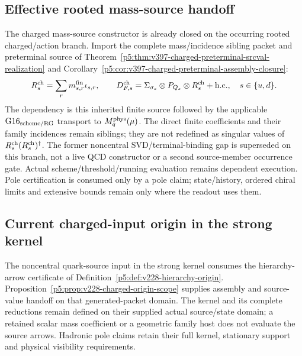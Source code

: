 \documentclass[12pt,a4paper]{article}
\begin{document}
\subsection{Effective rooted mass-source handoff}
\label{p10:sec:v2109-rooted-source-handoff}
The charged mass-source constructor is already closed on the occurring
rooted charged/action branch.  Import the complete mass/incidence sibling
packet and preterminal source of
Theorem~\ref{p5:thm:v397-charged-preterminal-srcval-realization} and
Corollary~\ref{p5:cor:v397-charged-preterminal-assembly-closure}:
\[
 R_s^{\rm ch}=\sum_r m_{s,r}^{\rm fin}\iota_{s,r},\qquad
 D_{F,s}^{\rm ch}
 =\Sigma_{\sigma_s}\otimes P_{Q_s}\otimes R_s^{\rm ch}+\mathrm{h.c.},
 \quad s\in\{u,d\}.
\]
The dependency is this inherited finite source followed by the applicable
\(\mathrm{G16}_{\rm scheme/RG}\) transport to \(M_q^{\rm phys}(\mu)\).
The direct finite coefficients and their family incidences remain siblings;
they are not redefined as singular values of $R_s^{\rm ch}(R_s^{\rm ch})^\dagger$.
The former noncentral SVD/terminal-binding gap is superseded on this branch,
not a live QCD constructor or a second source-member occurrence gate.
Actual scheme/threshold/running evaluation remains dependent execution.
Pole certification is consumed only by a pole claim; state/history, ordered
chiral limits and extensive bounds remain only where the readout uses them.



\subsection{Current charged-input origin in the strong kernel}
\label{p7a:sec:v228-charged-origin}
The noncentral quark-source input in the strong kernel consumes the
hierarchy-arrow certificate of
Definition~\ref{p5:def:v228-hierarchy-origin}.
Proposition~\ref{p5:prop:v228-charged-origin-scope} supplies assembly and
source-value handoff on that generated-packet domain. The kernel and its
complete reductions remain defined on their supplied actual source/state
domain; a retained scalar mass coefficient or a geometric family host does
not evaluate the source arrows. Hadronic pole claims retain their full
kernel, stationary support and physical visibility requirements.

\end{document}
